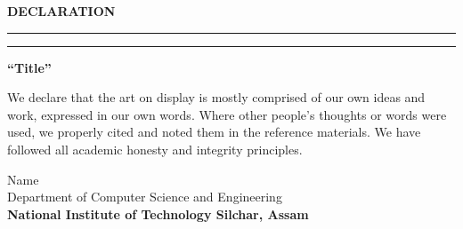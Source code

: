 \newpage
\thispagestyle{empty}

\begin{center}
\textbf{\LARGE{DECLARATION}}
\vspace{.1in}\hrule
\vspace{.05in}\hrule
\vspace{.4in}

\normalsize 
\textbf{``Title''}\\
\vspace{.6in}

We declare that the art on display is mostly comprised of our own ideas and work, expressed in our own words. Where other people's thoughts or words were used, we properly cited and noted them in the reference materials. We have followed all academic honesty and integrity principles.
\vspace{1in}

Name\\
\vspace{2in}
Department of Computer Science and Engineering\\
\textbf{National Institute of Technology Silchar, Assam}
\end{center}